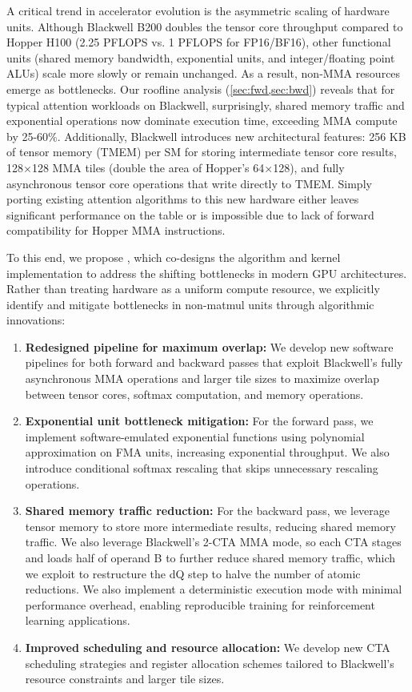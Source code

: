 A critical trend in accelerator evolution is the asymmetric scaling of hardware units. Although Blackwell B200 doubles the tensor core throughput compared to Hopper H100 (2.25 PFLOPS vs. 1 PFLOPS for FP16/BF16), other functional units (shared memory bandwidth, exponential units, and integer/floating point ALUs) scale more slowly or remain unchanged. As a result, non-MMA resources emerge as bottlenecks. Our roofline analysis (\cref{sec:fwd,sec:bwd}) reveals that for typical attention workloads on Blackwell, surprisingly, shared memory traffic and exponential operations now dominate execution time, exceeding MMA compute by 25-60\%. Additionally, Blackwell introduces new architectural features: 256 KB of tensor memory (TMEM) per SM for storing intermediate tensor core results, 128$\times$128 MMA tiles (double the area of Hopper's 64$\times$128), and fully asynchronous tensor core operations that write directly to TMEM. Simply porting existing attention algorithms to this new hardware either leaves significant performance on the table or is impossible due to lack of forward compatibility for Hopper MMA instructions.

To this end, we propose \faf, which co-designs the algorithm and kernel implementation to address the shifting bottlenecks in modern GPU architectures. Rather than treating hardware as a uniform compute resource, we explicitly identify and mitigate bottlenecks in non-matmul units through algorithmic innovations:

\begin{enumerate}[itemsep=0pt,topsep=0pt,leftmargin=*]
\item \textbf{Redesigned pipeline for maximum overlap:} We develop new software pipelines for both forward and backward passes that exploit Blackwell's fully asynchronous MMA operations and larger tile sizes to maximize overlap between tensor cores, softmax computation, and memory operations.

\item \textbf{Exponential unit bottleneck mitigation:} For the forward pass, we implement software-emulated exponential functions using polynomial approximation on FMA units, increasing exponential throughput. We also introduce conditional softmax rescaling that skips unnecessary rescaling operations.

\item \textbf{Shared memory traffic reduction:} For the backward pass, we leverage tensor memory to store more intermediate results, reducing shared memory traffic. We also leverage Blackwell’s 2-CTA MMA mode, so each CTA stages and loads half of operand B to further reduce shared memory traffic, which we exploit to restructure the dQ step to halve the number of atomic reductions. We also implement a deterministic execution mode with minimal performance overhead, enabling reproducible training for reinforcement learning applications.

\item \textbf{Improved scheduling and resource allocation:} We develop new CTA scheduling strategies and register allocation schemes tailored to Blackwell's resource constraints and larger tile sizes.
\end{enumerate}


